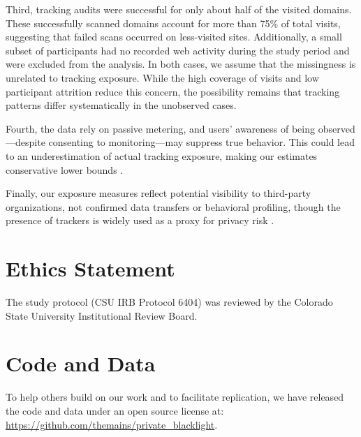 \documentclass[12pt, letterpaper]{article}
\begin{document}
Third, tracking audits were successful for only about half of the visited domains. These successfully scanned domains account for more than 75\% of total visits, suggesting that failed scans occurred on less-visited sites. Additionally, a small subset of participants had no recorded web activity during the study period and were excluded from the analysis. In both cases, we assume that the missingness is unrelated to tracking exposure. While the high coverage of visits and low participant attrition reduce this concern, the possibility remains that tracking patterns differ systematically in the unobserved cases.

Fourth, the data rely on passive metering, and users' awareness of being observed—despite consenting to monitoring—may suppress true behavior. This could lead to an underestimation of actual tracking exposure, making our estimates conservative lower bounds \citep{Bosch2024, penney2016chilling, bad_domains, ss-adult}.

Finally, our exposure measures reflect potential visibility to third-party organizations, not confirmed data transfers or behavioral profiling, though the presence of trackers is widely used as a proxy for privacy risk \citep{Dambra2022, karaj2018whotracks, blacklight, niforatos2021prevalence, zheutlin2021data, zheutlin2022data}.


\section*{Ethics Statement}
The study protocol (CSU IRB Protocol 6404) was reviewed by the Colorado State University Institutional Review Board.

\section*{Code and Data}
To help others build on our work and to facilitate replication, we have released the code and data under an open source license at: \url{https://github.com/themains/private_blacklight}.

\FloatBarrier
\singlespacing
\clearpage


\clearpage

\appendix
\onehalfspacing
\renewcommand{\thesection}{\Alph{section}}
\renewcommand\thetable{\thesection.\arabic{table}}
\renewcommand\thefigure{\thesection.\arabic{figure}}
\renewcommand\theequation{\thesection.\arabic{equation}}
\end{document}
